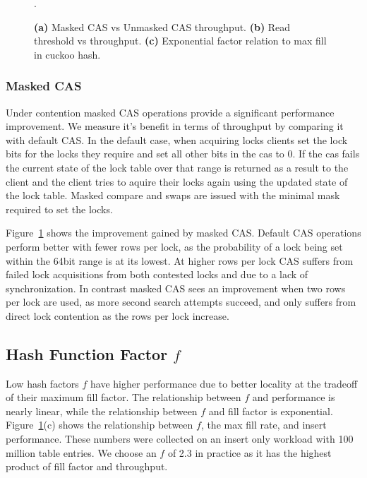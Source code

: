 \begin{figure}[t]
\begin{subfigure}{0.3\linewidth}
    \end{subfigure}.
    \vspace{-1em}
    \caption{
    \textbf{(a)} Masked CAS vs Unmasked CAS throughput.
    \textbf{(b)} Read threshold vs throughput.
    \textbf{(c)} Exponential factor relation to max fill in cuckoo hash.
    }
    \label{fig:performance_breakdown}

\end{figure}

\subsubsection{Masked CAS}

Under contention masked CAS operations provide a significant
performance improvement. We measure it's benefit in terms of
throughput by comparing it with default CAS. In the
default case, when acquiring locks clients set the lock bits
for the locks they require and set all other bits in the cas
to 0. If the cas fails the current state of the lock table
over that range is returned as a result to the client and
the client tries to aquire their locks again using the
updated state of the lock table. Masked compare and swaps
are issued with the minimal mask required to set the locks.

Figure~\ref{fig:performance_breakdown} shows the improvement
gained by masked CAS. Default CAS operations perform better
with fewer rows per lock, as the probability of a lock being
set within the 64bit range is at its lowest. At higher rows
per lock CAS suffers from failed lock acquisitions from both
contested locks and due to a lack of synchronization. In
contrast masked CAS sees an improvement when two rows per
lock are used, as more second search attempts succeed, and
only suffers from direct lock contention as the rows per
lock increase.


\subsection{Hash Function Factor $f$}

Low hash factors $f$ have higher performance due to better
locality at the tradeoff of their maximum fill factor. The
relationship between $f$ and performance is nearly linear,
while the relationship between $f$ and fill factor is
exponential. Figure~\ref{fig:performance_breakdown}(c) shows
the relationship between $f$, the max fill rate, and insert
performance. These numbers were collected on an insert only
workload with 100 million table entries. We choose an $f$ of
2.3 in practice as it has the highest product of fill factor
and throughput.

